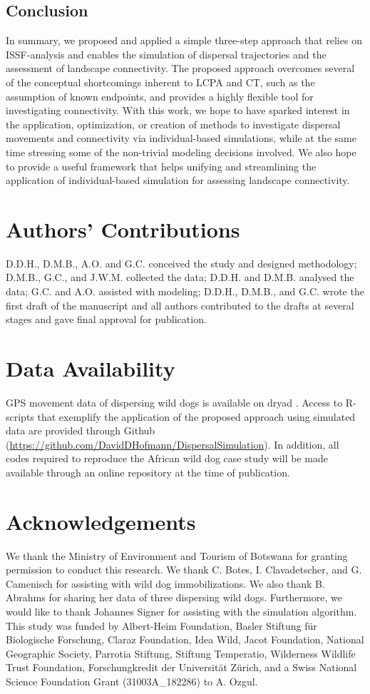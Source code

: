 \documentclass[abstract=on,10pt,a4paper,bibliography=totocnumbered]{article}
\begin{document}
\subsection{Conclusion}
In summary, we proposed and applied a simple three-step approach that relies on
ISSF-analysis and enables the simulation of dispersal trajectories and the
assessment of landscape connectivity. The proposed approach overcomes several of
the conceptual shortcomings inherent to LCPA and CT, such as the assumption of
known endpoints, and provides a highly flexible tool for investigating
connectivity. With this work, we hope to have sparked interest in the
application, optimization, or creation of methods to investigate dispersal
movements and connectivity via individual-based simulations, while at the same
time stressing some of the non-trivial modeling decisions involved. We also hope
to provide a useful framework that helps unifying and streamlining the
application of individual-based simulation for assessing landscape connectivity.

\section{Authors' Contributions}
D.D.H., D.M.B., A.O. and G.C. conceived the study and designed methodology;
D.M.B., G.C., and J.W.M. collected the data; D.D.H. and D.M.B. analysed the
data; G.C. and A.O. assisted with modeling; D.D.H., D.M.B., and G.C. wrote the
first draft of the manuscript and all authors contributed to the drafts at
several stages and gave final approval for publication.

\section{Data Availability}
GPS movement data of dispersing wild dogs is available on dryad
\citep{Hofmann.2021b}. Access to R-scripts that exemplify the application of the
proposed approach using simulated data are provided through Github
(\url{https://github.com/DavidDHofmann/DispersalSimulation}). In addition, all
codes required to reproduce the African wild dog case study will be made
available through an online repository at the time of publication.

\section{Acknowledgements}
We thank the Ministry of Environment and Tourism of Botswana for granting
permission to conduct this research. We thank C. Botes, I. Clavadetscher, and G.
Camenisch for assisting with wild dog immobilizations. We also thank B. Abrahms
for sharing her data of three dispersing wild dogs. Furthermore, we would like
to thank Johannes Signer for assisting with the simulation algorithm. This study
was funded by Albert-Heim Foundation, Basler Stiftung für Biologische Forschung,
Claraz Foundation, Idea Wild, Jacot Foundation, National Geographic Society,
Parrotia Stiftung, Stiftung Temperatio, Wilderness Wildlife Trust Foundation,
Forschungkredit der Universität Zürich, and a Swiss National Science Foundation
Grant (31003A\_182286) to A. Ozgul.

\newpage
\begingroup
\singlespacing

\endgroup
\end{document}
